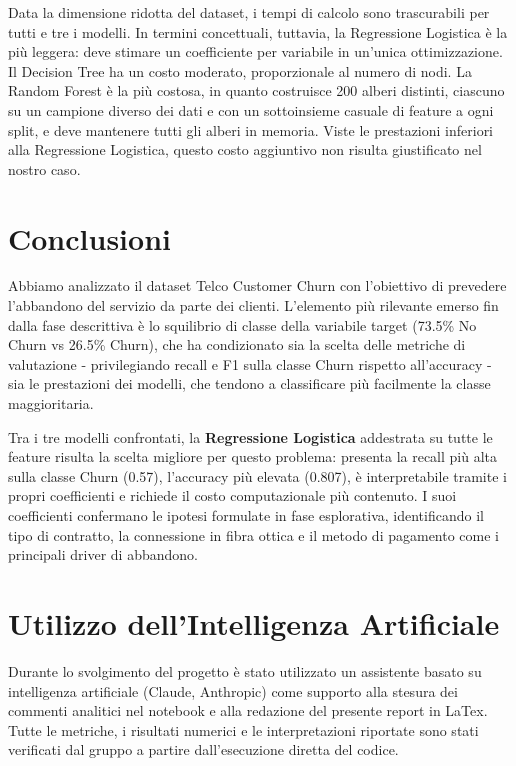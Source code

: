 \documentclass[11pt]{article}
\begin{document}
Data la dimensione ridotta del dataset, i tempi di calcolo sono trascurabili per tutti e tre i modelli. In termini concettuali, tuttavia, la Regressione Logistica è la più leggera: deve stimare un coefficiente per variabile in un'unica ottimizzazione. Il Decision Tree ha un costo moderato, proporzionale al numero di nodi. La Random Forest è la più costosa, in quanto costruisce 200 alberi distinti, ciascuno su un campione diverso dei dati e con un sottoinsieme casuale di feature a ogni split, e deve mantenere tutti gli alberi in memoria. Viste le prestazioni inferiori alla Regressione Logistica, questo costo aggiuntivo non risulta giustificato nel nostro caso.

\section{Conclusioni}
\label{sec:conclusioni}

Abbiamo analizzato il dataset Telco Customer Churn con l'obiettivo di prevedere l'abbandono del servizio da parte dei clienti. L'elemento più rilevante emerso fin dalla fase descrittiva è lo squilibrio di classe della variabile target (73.5\% No Churn vs 26.5\% Churn), che ha condizionato sia la scelta delle metriche di valutazione - privilegiando recall e F1 sulla classe Churn rispetto all'accuracy - sia le prestazioni dei modelli, che tendono a classificare più facilmente la classe maggioritaria.

Tra i tre modelli confrontati, la \textbf{Regressione Logistica} addestrata su tutte le feature risulta la scelta migliore per questo problema: presenta la recall più alta sulla classe Churn (0.57), l'accuracy più elevata (0.807), è interpretabile tramite i propri coefficienti e richiede il costo computazionale più contenuto. I suoi coefficienti confermano le ipotesi formulate in fase esplorativa, identificando il tipo di contratto, la connessione in fibra ottica e il metodo di pagamento come i principali driver di abbandono.

\section*{Utilizzo dell'Intelligenza Artificiale}

Durante lo svolgimento del progetto è stato utilizzato un assistente basato su intelligenza artificiale (Claude, Anthropic) come supporto alla stesura dei commenti analitici nel notebook e alla redazione del presente report in LaTex. Tutte le metriche, i risultati numerici e le interpretazioni riportate sono stati verificati dal gruppo a partire dall'esecuzione diretta del codice.



\end{document}
